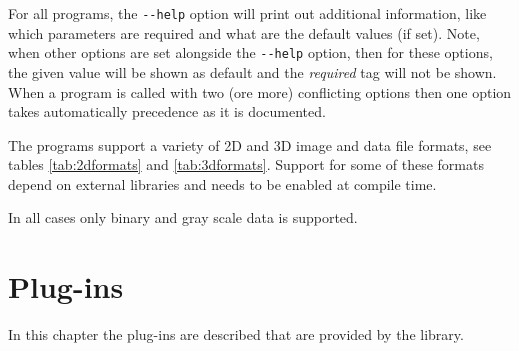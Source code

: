\documentclass[english, 10pt, a4paper,headsepline,openany]{scrbook}
\begin{document}
For all programs, the \texttt{-{}-help} option will print out additional information, like which parameters 
  are required and what are the default values (if set).
Note, when other options are set alongside the \texttt{-{}-help} option, then for these options, the given value 
  will be shown as default and the \emph{required} tag will not be shown.
When a program is called with two (ore more) conflicting options then one option takes automatically precedence 
  as it is documented. 


The programs support a variety of 2D and 3D image and data file formats, see tables \ref{tab:2dformats} 
and \ref{tab:3dformats}. 
Support for some of these formats depend on external libraries and needs to be enabled at compile time.

\begin{table}[h]
\caption{\label{tab:2dformats}2D image formats}
\end{table}

\begin{table}[h]
\caption{\label{tab:3dformats}3D image formats}
\end{table}

\noindent 
In all cases only binary and gray scale data is supported.




\chapter{Plug-ins}
\label{ch:plugins}

In this chapter the plug-ins are described that are provided by the library.





\cleardoublepage{}

\end{document}
